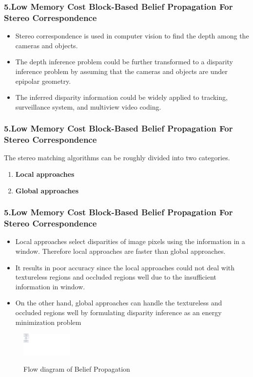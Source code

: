 \documentclass{beamer}
\begin{document}
\begin{frame}
\frametitle{\textbf{5.Low Memory Cost Block-Based Belief Propagation For Stereo Correspondence}}
\begin{itemize}
\item Stereo correspondence is used in computer vision to find the depth among the cameras and objects.
\item The depth inference problem could be further transformed  to  a disparity inference problem by assuming that the cameras and objects are under epipolar geometry.
\item The inferred disparity information could be widely applied to tracking, surveillance system, and multiview video coding.
\end{itemize}
\end{frame}


\begin{frame}
\frametitle{\textbf{5.Low Memory Cost Block-Based Belief Propagation For Stereo Correspondence}}
The stereo matching algorithms can be roughly divided into two categories.
\begin{enumerate}
  \item \textbf{Local approaches}
  \item \textbf{Global approaches}
\end{enumerate}
\end{frame}

\begin{frame}
\frametitle{\textbf{5.Low Memory Cost Block-Based Belief Propagation For Stereo Correspondence}}
\begin{itemize}
\item Local approaches select disparities of image pixels using the information in a window. Therefore local approaches are faster than global approaches.
\item  It results in poor accuracy since the local approaches could not deal with textureless regions and occluded regions well due to the insufficient information in window.
\item On the other hand, global approaches can handle the textureless and occluded regions well by formulating disparity inference as an energy minimization problem
\end{itemize}
\end{frame}
\begin{frame}
\begin{figure}
  \includegraphics[width=1in]{block1.pdf}\\
  \caption{Flow diagram of Belief Propagation}\label{}
\end{figure}
\end{frame}
\end{document}
